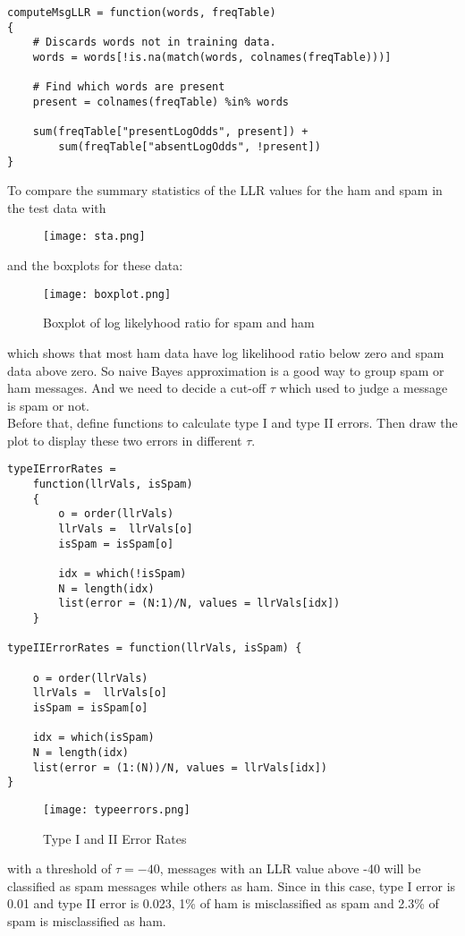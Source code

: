 \documentclass{article}
\begin{document}
\begin{verbatim}
computeMsgLLR = function(words, freqTable) 
{
    # Discards words not in training data.
    words = words[!is.na(match(words, colnames(freqTable)))]
    
    # Find which words are present
    present = colnames(freqTable) %in% words
    
    sum(freqTable["presentLogOdds", present]) +
        sum(freqTable["absentLogOdds", !present])
}
\end{verbatim}
 To compare the summary statistics of the LLR values for the ham and spam in the test data with
\begin{figure}[H] 
\begin{center} 
\texttt{[image: sta.png]}  
\label{sta} 
\end{center} 
\end{figure}
and the boxplots for these data: 
\begin{figure}[H] 
\begin{center} 
\texttt{[image: boxplot.png]}  
\caption{Boxplot of log likelyhood ratio for spam and ham} 
\label{spd} 
\end{center} 
\end{figure}
which shows that most ham data have log likelihood ratio below zero and spam data above zero. So naive Bayes approximation is a good way to group spam or ham messages. And we need to decide a cut-off $\tau$ which used to judge a message is spam or not. \\

Before that, define functions to calculate type I and type II errors. Then draw the plot to display these two errors in different $\tau$.
\begin{verbatim}
typeIErrorRates = 
    function(llrVals, isSpam) 
    {
        o = order(llrVals)
        llrVals =  llrVals[o]
        isSpam = isSpam[o]
        
        idx = which(!isSpam)
        N = length(idx)
        list(error = (N:1)/N, values = llrVals[idx])
    }

typeIIErrorRates = function(llrVals, isSpam) {
    
    o = order(llrVals)
    llrVals =  llrVals[o]
    isSpam = isSpam[o]
    
    idx = which(isSpam)
    N = length(idx)
    list(error = (1:(N))/N, values = llrVals[idx])
}  
\end{verbatim}

\begin{figure}[H] 
\begin{center} 
\texttt{[image: typeerrors.png]}  
\caption{Type I and II Error Rates} 
\label{spd} 
\end{center} 
\end{figure}
with a threshold of $\tau =-40$, messages with an LLR value above -40 will be classified as spam messages while others as ham. Since in this case, type I error is 0.01 and type II error is 0.023, 1\% of ham is misclassified as spam and 2.3\% of spam is misclassified as ham.
\end{document}
